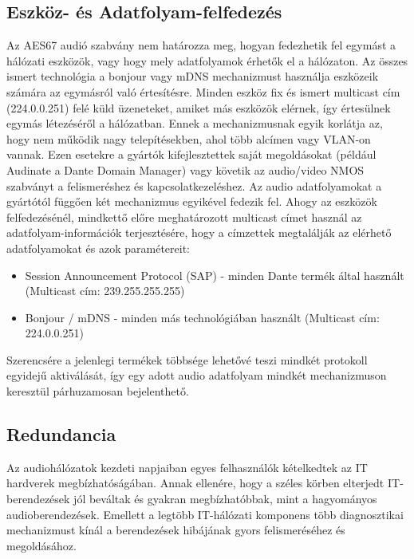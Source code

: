 \subsection{Eszköz- és Adatfolyam-felfedezés}

Az AES67 audió szabvány nem határozza meg, hogyan fedezhetik fel egymást a
hálózati eszközök, vagy hogy mely adatfolyamok érhetők el a hálózaton.
Az összes ismert technológia a bonjour vagy mDNS mechanizmust használja eszközeik számára
az egymásról való értesítésre. 
Minden eszköz fix és ismert multicast cím (224.0.0.251) felé küld
üzeneteket, amiket más eszközök elérnek, így értesülnek egymás létezéséről a hálózatban.
Ennek a mechanizmusnak egyik korlátja az, hogy nem működik nagy telepítésekben,
ahol több alcímen vagy VLAN-on vannak. Ezen esetekre a gyártók kifejlesztettek
saját megoldásokat (például Audinate a Dante Domain Manager) vagy
követik az audio/video NMOS szabványt a felismeréshez és kapcsolatkezeléshez.
Az audio adatfolyamokat a gyártótól függően két mechanizmus egyikével fedezik fel. Ahogy
az eszközök felfedezésénél, mindkettő előre meghatározott multicast címet
használ az adatfolyam-információk terjesztésére, hogy a címzettek megtalálják az
elérhető adatfolyamokat és azok paramétereit:

\begin{itemize}
	\item Session Announcement Protocol (SAP) - minden Dante termék által használt (Multicast cím: 239.255.255.255)
\end{itemize}

\begin{itemize}
	\item Bonjour / mDNS - minden más technológiában használt (Multicast cím: 224.0.0.251) 
\end{itemize}
Szerencsére a jelenlegi termékek többsége
lehetővé teszi mindkét protokoll egyidejű aktiválását, így egy adott audio
adatfolyam mindkét mechanizmuson keresztül párhuzamosan bejelenthető.

\subsection{Redundancia}
Az audiohálózatok kezdeti napjaiban egyes felhasználók kételkedtek az IT
hardverek megbízhatóságában. Annak ellenére, hogy a széles körben elterjedt
IT-berendezések jól beváltak és gyakran megbízhatóbbak, mint a hagyományos
audioberendezések. Emellett a legtöbb IT-hálózati komponens több diagnosztikai
mechanizmust kínál a berendezések hibájának gyors felismeréséhez és megoldásához.
